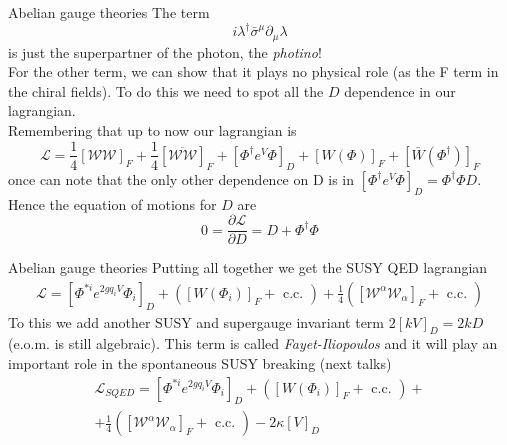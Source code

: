 \documentclass[10pt]{beamer}
\begin{document}
\begin{frame}{Abelian gauge theories}
The term 
\begin{equation*}
    i\lambda^{\dagger} \bar\sigma^{\mu}\partial_{\mu} \lambda
\end{equation*}
is just the superpartner of the photon, the \emph{photino}! \\
For the other term, we can show that it plays no physical role (as the F term in the chiral fields). To do this we need to spot all the $D$ dependence in our lagrangian. \\
Remembering that up to now our lagrangian is 
\begin{equation*}
    \mathcal{L} = \frac{1}{4}\left[\mathcal{WW}\right]_F + \frac{1}{4} \left[\overline{\mathcal{WW}}\right]_F + \left[\Phi^{\dagger} e^V \Phi\right]_D + [W(\Phi)]_F + [\bar W(\Phi^{\dagger})]_F
\end{equation*}
once can note that the only other dependence on D is in $\left[\Phi^{\dagger} e^V \Phi \right]_D = \Phi^{\dagger}\Phi D$.
Hence the equation of motions for $D$ are
\begin{equation*}
    0 = \frac{\partial \mathcal{L}}{\partial D} = D + \Phi^{\dagger} \Phi 
\end{equation*}
\end{frame}

\begin{frame}{Abelian gauge theories}
Putting all together we get the SUSY QED lagrangian 
\begin{gather*}
    \mathcal{L}=\left[\Phi^{* i} e^{2 g q_{i} V}{\Phi_{i}}\right]_{D}+\left(\left[W\left(\Phi_{i}\right)\right]_{F}+\text { c.c. }\right)+\frac{1}{4}\left(\left[\mathcal{W}^{\alpha} \mathcal{W}_{\alpha}\right]_{F}+\text { c.c. }\right)
\end{gather*}
To this we add another SUSY and supergauge invariant term $2[kV]_D = 2kD$ (e.o.m. is still algebraic). 
This term is called \emph{Fayet-Iliopoulos} and it will play an important role in the spontaneous SUSY breaking (next talks)
\begin{equation*}
    \boxed{
        \begin{gathered}
        \mathcal{L}_{SQED} = \left[\Phi^{* i} e^{2 g q_{i} V} {\Phi_{i}}\right]_{D}+\left(\left[W\left(\Phi_{i}\right)\right]_{F}+\text { c.c. }\right)+ \\ 
        +\frac{1}{4}\left(\left[\mathcal{W}^{\alpha} \mathcal{W}_{\alpha}\right]_{F}+\text { c.c. }\right)-2 \kappa[V]_{D}
        \end{gathered}}
\end{equation*}
\end{frame}
\end{document}
